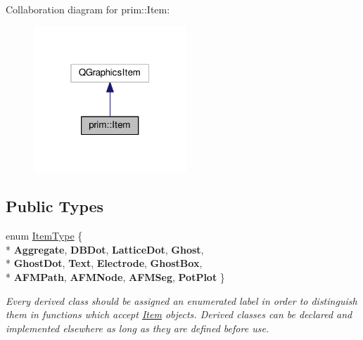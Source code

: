 Collaboration diagram for prim\+:\+:Item\+:\nopagebreak
\begin{figure}[H]
\begin{center}
\leavevmode
\includegraphics[width=163pt]{classprim_1_1Item__coll__graph}
\end{center}
\end{figure}
\subsection*{Public Types}
\begin{DoxyCompactItemize}
\item 
enum \hyperlink{classprim_1_1Item_a5c096201e92c0b15a62c7af1cff1d79c}{Item\+Type} \{ \\*
{\bfseries Aggregate}, 
{\bfseries D\+B\+Dot}, 
{\bfseries Lattice\+Dot}, 
{\bfseries Ghost}, 
\\*
{\bfseries Ghost\+Dot}, 
{\bfseries Text}, 
{\bfseries Electrode}, 
{\bfseries Ghost\+Box}, 
\\*
{\bfseries A\+F\+M\+Path}, 
{\bfseries A\+F\+M\+Node}, 
{\bfseries A\+F\+M\+Seg}, 
{\bfseries Pot\+Plot}
 \}\hypertarget{classprim_1_1Item_a5c096201e92c0b15a62c7af1cff1d79c}{}\label{classprim_1_1Item_a5c096201e92c0b15a62c7af1cff1d79c}
\begin{DoxyCompactList}\small\item\em Every derived class should be assigned an enumerated label in order to distinguish them in functions which accept \hyperlink{classprim_1_1Item}{Item} objects. Derived classes can be declared and implemented elsewhere as long as they are defined before use. \end{DoxyCompactList}
\end{DoxyCompactItemize}
